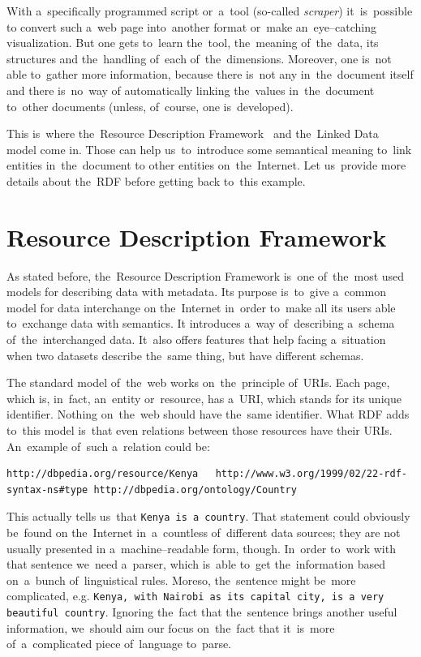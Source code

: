 With a~specifically programmed script or~a~tool (so-called \emph{scraper}) it~is~possible to
convert such a~web page into~another format or~make an~eye--catching visualization.
But one gets to~learn the~tool, the~meaning of~the~data, its structures and the~handling of~each of~the~dimensions. Moreover, one is~not able to~gather more information,
because there is~not any in~the~document itself and there is~no~way of
automatically linking the~values in~the~document to~other documents (unless, of~course,
one is~developed).

This is~where the~Resource Description Framework~\cite{rdf} and the~Linked Data~\cite{ld}
model come in. Those
can help us~to~introduce some semantical meaning to~link entities in~the~document to
other entities on~the~Internet. Let us~provide more details about the~RDF before getting
back to~this example.

\section{Resource Description Framework}
As stated before, the~Resource Description Framework is~one of~the~most used models for
describing data with metadata. Its purpose is~to~give a~common model for data interchange
on the~Internet in~order to~make all its users able to~exchange data with semantics.
It introduces a~way of~describing a~schema of~the~interchanged data. It~also 
offers features that help facing a~situation when two datasets describe the~same thing,
but have different schemas.

The standard model of~the~web works on~the~principle of~URIs. Each page, which is, in~fact,
an~entity or~resource, has a~URI, which stands for its unique identifier. Nothing on~the~web
should have the~same identifier. What RDF adds to~this model is~that even relations
between those resources have their URIs. An~example of~such a~relation could be:

\tiny\begin{verbatim}
http://dbpedia.org/resource/Kenya   http://www.w3.org/1999/02/22-rdf-syntax-ns#type http://dbpedia.org/ontology/Country  
\end{verbatim}\normalsize

This actually tells us~that \texttt{Kenya is~a~country}. That statement could obviously be~found on
the~Internet in~a~countless of~different data sources; they are not usually presented
in a~machine--readable form, though. In~order to~work with that sentence we~need a~parser, which is~able to~get the~information based on~a~bunch of~linguistical rules.
Moreso, the~sentence might be~more complicated, e.g. \texttt{Kenya, with Nairobi as~its capital city,
is a~very beautiful country}. Ignoring the~fact that the~sentence brings another useful
information, we~should aim our focus on~the~fact that it~is~more of~a~complicated piece of~language to~parse. 

